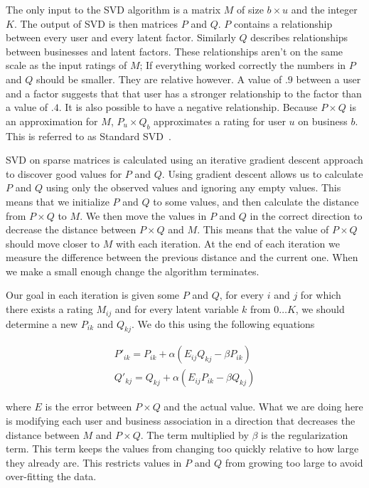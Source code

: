 The only input to the SVD algorithm is a matrix $M$ of size $b \times u$ and the
integer $K$. The output of SVD is then matrices $P$ and $Q$. $P$ contains a
relationship between every user and every latent factor. Similarly $Q$ describes
relationships between businesses and latent factors. These relationships aren't
on the same scale as the input ratings of $M$; If everything worked correctly
the numbers in $P$ and $Q$ should be smaller. They are relative however. A value
of $.9$ between a user and a factor suggests that that user has a stronger
relationship to the factor than a value of $.4$. It is also possible to have a
negative relationship. Because $P \times Q$ is an
approximation for $M$, $P_u \times Q_b$ approximates a rating for user $u$ on
business $b$. This is referred to as Standard SVD~\cite{netflix paper}.

SVD on sparse matrices is calculated using an iterative gradient descent
approach to discover good values for $P$ and $Q$. Using gradient descent allows
us to calculate $P$ and $Q$ using only the observed values and ignoring any
empty values. This means that we initialize $P$ and $Q$ to some values, and
then calculate the distance from $P \times Q$ to $M$. We then move the values
in $P$ and $Q$ in the correct direction to decrease the distance between $P
\times Q$ and $M$. This means that the value of $P \times Q$ should move closer
to $M$ with each iteration. At the end of each iteration we measure the
difference between the previous distance and the current one. When we make a
small enough change the algorithm terminates.

Our goal in each iteration is given some $P$ and $Q$, for every $i$ and $j$ for
which there exists a rating $M_{ij}$ and for every latent variable $k$ from
$0\ldots K$, we should determine a new $P_{ik}$ and $Q_{kj}$. We do this using the
following equations

\[
\begin{array}{c}
P'_{ik}=P_{ik} + \alpha(E_{ij}Q_{kj}-\beta P_{ik}) \\
Q'_{kj}=Q_{kj} + \alpha(E_{ij}P_{ik}-\beta Q_{kj})
\end{array}
\]

\noindent where $E$ is the error between $P \times Q$ and the actual value. What
we are doing here is modifying each user and business association in a direction
that decreases the distance between $M$ and $P \times Q$. The term multiplied by
$\beta$ is the regularization term. This term keeps the values from changing too
quickly relative to how large they already are. This restricts values in $P$ and
$Q$ from growing too large to avoid over-fitting the data.

